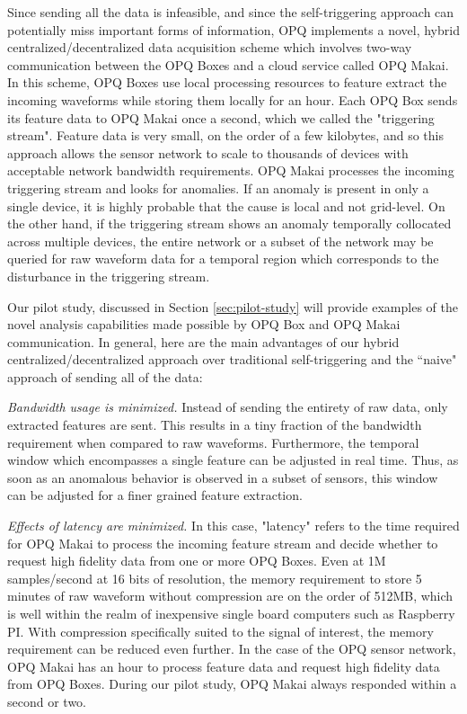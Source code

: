 Since sending all the data is infeasible, and since the self-triggering approach can potentially miss important forms of information, OPQ implements a novel, hybrid centralized/decentralized data acquisition scheme which involves two-way communication between the OPQ Boxes and a cloud service called OPQ Makai. In this scheme, OPQ Boxes use local processing resources to feature extract the incoming waveforms while storing them locally for an hour. Each OPQ Box sends its feature data to OPQ Makai once a second, which we called the "triggering stream". Feature data is very small, on the order of a few kilobytes, and so this approach allows the sensor network to scale to thousands of devices with acceptable network bandwidth requirements.  OPQ Makai processes the incoming triggering stream and looks for anomalies. If an anomaly is present in only a single device, it is highly probable that the cause is local and not grid-level. On the other hand, if the triggering stream shows an anomaly temporally collocated across multiple devices, the entire network or a subset of the network may be queried for raw waveform data for a temporal region which corresponds to the disturbance in the triggering stream.

Our pilot study, discussed in Section \ref{sec:pilot-study} will provide examples of the novel analysis capabilities made possible by OPQ Box and OPQ Makai communication. In general, here are the main advantages of our hybrid centralized/decentralized approach over traditional self-triggering and the ``naive" approach of sending all of the data:

{\em Bandwidth usage is minimized.} Instead of sending the entirety of raw data, only extracted features are sent. This results in a tiny fraction of the bandwidth requirement when compared to raw waveforms. Furthermore, the temporal window which encompasses a single feature can be adjusted in real time. Thus, as soon as an anomalous behavior is observed in a subset of sensors, this window can be adjusted for a finer grained feature extraction.

{\em Effects of latency are minimized.} In this case, "latency" refers to the time required for OPQ Makai to process the incoming feature stream and decide whether to request high fidelity data from one or more OPQ Boxes. Even at 1M samples/second at 16 bits of resolution, the memory requirement to store 5 minutes of raw waveform without compression are on the order of 512MB, which is well within the realm of inexpensive single board computers such as Raspberry PI. With compression specifically suited to the signal of interest, the memory requirement can be reduced even further. In the case of the OPQ sensor network, OPQ Makai has an hour to process feature data and request high fidelity data from OPQ Boxes. During our pilot study, OPQ Makai always responded within a second or two.

